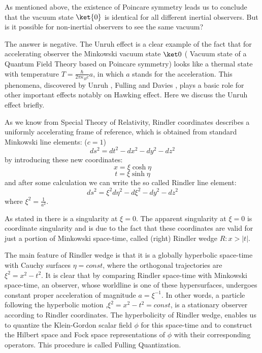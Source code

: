 \documentclass[12pt]{article}
\begin{document}
As mentioned above, the existence of Poincare symmetry leads us to conclude that the vacuum state $\ket{0}$ is identical for all different inertial observers.
But is it possible for non-inertial observers to see the same vacuum? 

The answer is negative. The Unruh effect is a clear example of the fact that for accelerating observer the Minkowski vacuum state $\ket0$ ( Vacuum state of a Quantum Field Theory based on Poincare symmetry) looks like a thermal state with temperature $ T= \frac{\hbar}{2\pi\kappa_B c} a$, in which $a$ stands for the acceleration. This phenomena, discovered by Unruh\cite{Unruh} , Fulling\cite{Fulling}  and Davies \cite{Davies} , plays a basic role for other important effects notably on Hawking effect. Here we discuss the Unruh effect briefly.

 As we know from Special Theory of Relativity, Rindler coordinates describes a uniformly accelerating frame of reference, which is obtained from standard Minkowski line elements: ($c=1$)
\begin{equation}
ds^2=dt^2-dx^2-dy^2-dz^2
\end{equation}
 by introducing these new coordinates:
\begin{equation}\label{transformation}
x=\xi \cosh{\eta}  
\end{equation}
$$ t=\xi \sinh{\eta}$$ 
and after some calculation we can write the so called Rindler line element: 
\begin{equation}
ds^2=\xi^2 d\eta^2-d\xi^2-dy^2-dz^2
\end{equation} where $\xi^2=\frac{1}{a^2}$. 

As stated in \cite{Arageorgis} there is a singularity at $\xi=0$. The apparent singularity at $\xi=0$ is coordinate singularity and is due to the fact that these coordinates are valid for just a portion of Minkowski space-time, called (right) Rindler wedge $R: x> |t|$.

The main feature of Rindler wedge is that it is a globally hyperbolic space-time with Cauchy surfaces $\eta=const$, where the orthogonal trajectories are $\xi^2=x^2 - t^2$. It is clear that by comparing Rindler space-time with Minkowski space-time, an observer, whose worldline is one of these hypersurfaces, undergoes constant proper acceleration of magnitude $a=\xi^{-1}$. In other words, a particle following the hyperbolic motion ,$\xi^2=x^2-t^2=const$, is a stationary observer according to Rindler coordinates.
The hyperbolicity of Rindler wedge, enables us to quantize the Klein-Gordon scalar field  $\phi$ for this space-time and to construct the Hilbert space and Fock space representations of $\phi$ with their corresponding operators. This procedure is called Fulling Quantization.
\end{document}
